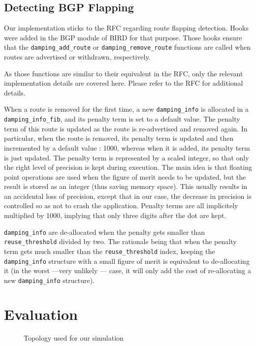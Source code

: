 \documentclass[a4paper,english]{IEEEtran}
\begin{document}
\subsection{Detecting BGP Flapping}

Our implementation sticks to the RFC regarding route flapping detection.
Hooks were added in the BGP module of BIRD for that purpose.
Those hooks ensure that the {\tt\small damping\_add\_route} or {\tt\small damping\_remove\_route} functions are 
called when routes are advertised or withdrawn, respectively.

As those functions are similar to their equivalent in the RFC, only the relevant implementation details are covered here.
Please refer to the RFC for additional details.

When a route is removed for the first time, a new {\tt\small damping\_info} is allocated in a {\tt\small damping\_info\_fib}, and its penalty term is set to a default value.
The penalty term of this route is updated as the route is re-advertised and removed again.
In particular, when the route is removed, its penalty term is updated and then incremented by a default value : 1000, whereas when it is added, its penalty term is just updated.
The penalty term is represented by a scaled integer, so that only the right level of precision is kept during execution.
The main idea is that floating point operations are used when the figure of merit needs to be updated, but the result is stored as an integer (thus saving memory space).
This usually results in an accidental loss of precision, except that in our case, the decrease in precision is controlled so as not to crash the application.
Penalty terms are all implicitely multiplied by 1000, implying that only three digits after the dot are kept.

{\tt\small damping\_info} are de-allocated when the penalty gets smaller than {\tt\small reuse\_threshold} divided by two.
The rationale being that when the penalty term gets much smaller than the {\tt\small reuse\_threshold} index, keeping the {\tt\small damping\_info} structure with a small figure of merit is equivalent to de-allocating it (in the worst ---very unlikely --- case, it will only add the cost of re-allocating a new {\tt\small damping\_info} structure).

\section{Evaluation}

\begin{figure}
\caption{Topology used for our simulation}

\end{figure}
\end{document}

